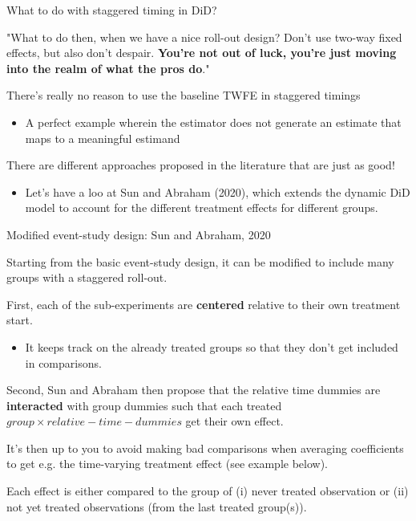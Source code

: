 \documentclass[notes,11pt, aspectratio=169]{beamer}
\newenvironment{wideitemize}{\itemize\addtolength{\itemsep}{10pt}}{\enditemize}
\begin{document}
\begin{frame}{What to do with staggered timing in DiD?}

  \begin{center}
      "What to do then, when we have a nice roll-out design? Don't use two-way fixed effects, but also don't despair. \textbf{You're not out of luck, you're just moving into the realm of what the pros do}." \color{gray}{(The effect)}
  \end{center}
  
  \begin{wideitemize}
  \item There's really no reason to use the baseline TWFE in staggered timings
    \begin{itemize}
    \item A perfect example wherein the estimator does not generate an
      estimate that maps to a meaningful estimand
    \end{itemize}
  \item There are different approaches proposed in the literature  that are just as good! 
    \begin{itemize}
    \item Let's have a loo at Sun and Abraham (2020), which extends the dynamic DiD model to account for the different treatment effects for different groups.     
    \end{itemize}
  \end{wideitemize}
\end{frame}

\begin{frame}{Modified event-study design: Sun and Abraham, 2020}
\begin{wideitemize}
    \item Starting from the basic event-study design, it can be modified to include many groups with a staggered roll-out.
    \item First, each of the sub-experiments are \textbf{centered} relative to their own treatment start.
    
    \begin{itemize}
        \item It keeps track on the already treated groups so that they don't get included in comparisons.
    \end{itemize}
    
    \item Second, Sun and Abraham then propose that the relative time dummies are \textbf{interacted} with group dummies such that each treated $group\times relative-time-dummies$ get their own effect. 
    
    \item It's then up to you to avoid making bad comparisons when averaging coefficients to get e.g. the time-varying treatment effect (see example below).

    \item Each effect is either compared to the group of (i) never treated observation or (ii) not yet treated observations (from the last treated group(s)).
    
\end{wideitemize}
\end{frame}
\end{document}
